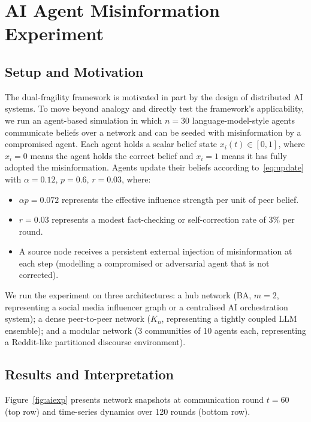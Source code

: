 \documentclass[10pt,twocolumn]{article}
\theoremstyle{myproof}
\begin{document}
\section{AI Agent Misinformation Experiment}
\label{sec:aiexp}

\subsection{Setup and Motivation}
The dual-fragility framework is motivated in part by the design of distributed AI systems. To
move beyond analogy and directly test the framework's applicability, we run an agent-based
simulation in which $n=30$ language-model-style agents communicate beliefs over a network and
can be seeded with misinformation by a compromised agent. Each agent holds a scalar belief state
$x_i(t)\in[0,1]$, where $x_i=0$ means the agent holds the correct belief and $x_i=1$ means
it has fully adopted the misinformation. Agents update their beliefs according to~\eqref{eq:update}
with $\alpha=0.12$, $p=0.6$, $r=0.03$, where:
\begin{itemize}
  \item $\alpha p=0.072$ represents the effective influence strength per unit of peer belief.
  \item $r=0.03$ represents a modest fact-checking or self-correction rate of 3\% per round.
  \item A source node receives a persistent external injection of misinformation at each step
        (modelling a compromised or adversarial agent that is not corrected).
\end{itemize}

We run the experiment on three architectures: a hub network (BA, $m=2$, representing a social
media influencer graph or a centralised AI orchestration system); a dense peer-to-peer network
($K_n$, representing a tightly coupled LLM ensemble); and a modular network (3 communities of 10
agents each, representing a Reddit-like partitioned discourse environment).

\subsection{Results and Interpretation}
Figure~\ref{fig:aiexp} presents network snapshots at communication round $t=60$ (top row) and
time-series dynamics over 120 rounds (bottom row).
\end{document}
